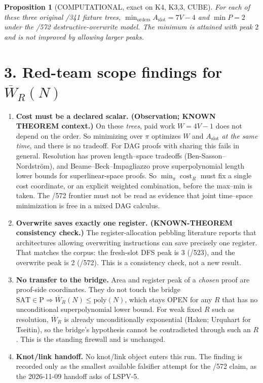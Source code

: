 \documentclass[11pt]{article}
\newtheorem{proposition}{Proposition}
\begin{document}
\begin{proposition}[COMPUTATIONAL, exact on K4, K3,3, CUBE]
For each of these three original /341 fixture trees, $\min_{\text{orders}}A_{\mathrm{slot}}=7V-4$ and $\min P=2$ under the /572 destructive-overwrite model. The minimum is attained with peak $2$ and is not improved by allowing larger peaks.
\end{proposition}

\section*{3. Red-team scope findings for $\overline W_R(N)$}
\begin{enumerate}
\item \textbf{Cost must be a declared scalar. (Observation; KNOWN THEOREM context.)} On these \emph{trees}, paid work $W=4V-1$ does not depend on the order. So minimizing over $\pi$ optimizes $W$ and $A_{\mathrm{slot}}$ \emph{at the same time}, and there is no tradeoff. For DAG proofs with sharing this fails in general. Resolution has proven length--space tradeoffs (Ben-Sasson--Nordstr\"om), and Beame--Beck--Impagliazzo prove superpolynomial length lower bounds for superlinear-space proofs. So $\min_\pi \operatorname{cost}_R$ must fix a single cost coordinate, or an explicit weighted combination, before the max--min is taken. The /572 frontier must not be read as evidence that joint time--space minimization is free in a mixed DAG calculus.
\item \textbf{Overwrite saves exactly one register. (KNOWN-THEOREM consistency check.)} The register-allocation pebbling literature reports that architectures allowing overwriting instructions can save precisely one register. That matches the corpus: the fresh-slot DFS peak is 3 (/523), and the overwrite peak is 2 (/572). This is a consistency check, not a new result.
\item \textbf{No transfer to the bridge.} Area and register peak of a \emph{chosen} proof are proof-side coordinates. They do not touch the bridge $\mathrm{SAT}\in\mathrm{P}\Rightarrow\overline W_R(N)\le\mathrm{poly}(N)$, which stays OPEN for any $R$ that has no unconditional superpolynomial lower bound. For weak fixed $R$ such as resolution, $\overline W_R$ is already unconditionally exponential (Haken; Urquhart for Tseitin), so the bridge's hypothesis cannot be contradicted through such an $R$. This is the standing firewall and is unchanged.
\item \textbf{Knot/link handoff.} No knot/link object enters this run. The finding is recorded only as the smallest available falsifier attempt for the /572 claim, as the 2026-11-09 handoff asks of LSPV-5.
\end{enumerate}
\end{document}
